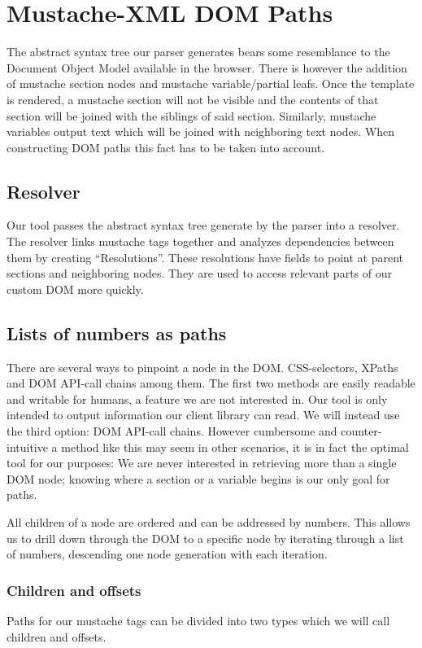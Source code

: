 \documentclass[thesis.tex]{subfiles}
\begin{document}
\section{Mustache-XML DOM Paths}
\label{sec:paths}
The abstract syntax tree our parser generates bears some resemblance to the
Document Object Model available in the browser. There is however the addition of
mustache section nodes and mustache variable/partial leafs.
Once the template is rendered, a mustache section will not be visible and the
contents of that section will be joined with the siblings of said section.
Similarly, mustache variables output text which will be joined with neighboring
text nodes. When constructing DOM paths this fact has to be taken into account.

\subsection{Resolver}
\label{sec:resolver}
Our tool passes the abstract syntax tree generate by the parser into a resolver.
The resolver links mustache tags together and analyzes dependencies between
them by creating ``Resolutions''. These resolutions have fields to point at
parent sections and neighboring nodes. They are used to access relevant parts of
our custom DOM more quickly.

\subsection{Lists of numbers as paths}
There are several ways to pinpoint a node in the DOM. CSS-selectors, XPaths and
DOM API-call chains among them. The first two methods are easily
readable and writable for humans, a feature we are not interested in.
Our tool is only intended to output information our client library can read.
We will instead use the third option: DOM API-call chains. However cumbersome
and counter-intuitive a method like this may seem in other scenarios, it is
in fact the optimal tool for our purposes: We are never interested in retrieving
more than a single DOM node; knowing where a section or a variable begins is our
only goal for paths.

All children of a node are ordered and can be addressed by numbers. This allows
us to drill down through the DOM to a specific node by iterating through a list
of numbers, descending one node generation with each iteration.

\subsubsection{Children and offsets}
\label{sec:children-offsets}
Paths for our mustache tags can be divided into two types which we will call
children and offsets.
\end{document}

